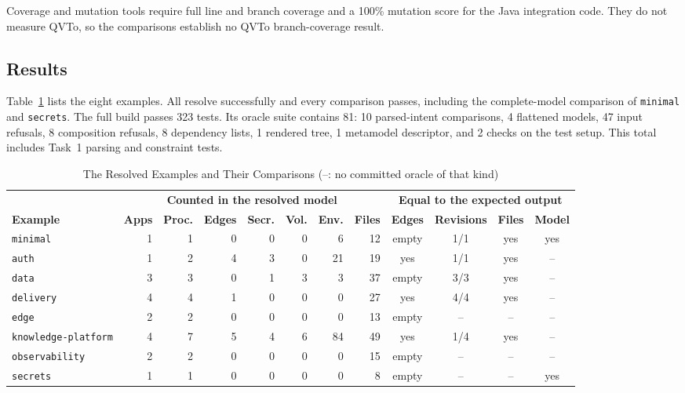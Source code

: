 Coverage and mutation tools require full line and branch coverage and a
100\% mutation score for the Java integration code. They do not measure
QVTo, so the comparisons establish no QVTo branch-coverage result.

\subsection{Results}
\label{sec:results}

Table~\ref{tab:results} lists the eight examples. All resolve successfully
and every comparison passes, including the complete-model comparison of
\texttt{minimal} and \texttt{secrets}. The full build passes 323 tests.
Its oracle suite contains 81: 10 parsed-intent comparisons, 4 flattened
models, 47 input refusals, 8 composition refusals, 8 dependency
lists, 1 rendered tree, 1 metamodel descriptor, and 2 checks on the
test setup. This total includes Task~1 parsing and constraint tests.

\begin{table}[!htbp]
\centering
\setlength{\tabcolsep}{3pt}
\begin{tabular}{lrrrrrrrcccc}
\hline
& \multicolumn{7}{c}{\textbf{Counted in the resolved model}} & \multicolumn{4}{c}{\textbf{Equal to the expected output}} \\
\textbf{Example} & \textbf{Apps} & \textbf{Proc.} & \textbf{Edges} &
  \textbf{Secr.} & \textbf{Vol.} & \textbf{Env.} & \textbf{Files} &
  \textbf{Edges} & \textbf{Revisions} & \textbf{Files} & \textbf{Model} \\
\hline
\texttt{minimal}            & 1 & 1 & 0 & 0 & 0 & 6  & 12 & empty & 1/1 & yes & yes \\
\texttt{auth}               & 1 & 2 & 4 & 3 & 0 & 21 & 19 & yes & 1/1 & yes & -- \\
\texttt{data}               & 3 & 3 & 0 & 1 & 3 & 3  & 37 & empty & 3/3 & yes & -- \\
\texttt{delivery}           & 4 & 4 & 1 & 0 & 0 & 0  & 27 & yes & 4/4 & yes & -- \\
\texttt{edge}               & 2 & 2 & 0 & 0 & 0 & 0  & 13 & empty & -- & -- & -- \\
\texttt{knowledge-platform} & 4 & 7 & 5 & 4 & 6 & 84 & 49 & yes & 1/4 & yes & -- \\
\texttt{observability}      & 2 & 2 & 0 & 0 & 0 & 0  & 15 & empty & -- & -- & -- \\
\texttt{secrets}            & 1 & 1 & 0 & 0 & 0 & 0  & 8  & empty & -- & -- & yes \\
\hline
\end{tabular}
\caption{The Resolved Examples and Their Comparisons (--: no committed oracle of that kind)}
\label{tab:results}
\end{table}

